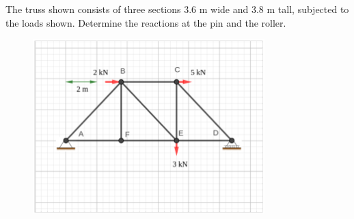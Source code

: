 
The truss shown consists of three sections 3.6 m wide and 3.8 m tall, subjected to the loads shown.
Determine the reactions at the pin and the roller.

\begin{figure}[ht!]
  \centering
  \includegraphics[width=0.8\textwidth,height=0.5\textheight,keepaspectratio]{fig.png}
\end{figure}

\iftoggle{flagSoln}{%
\vspace{.5cm}
\rule{\textwidth}{.4pt}
\vspace{.5cm}
\textbf{Solution:}
$D = 4.463 kN$ up, $A_x = 7 kN$, $A_y = 1.463 kN$ (TODO: check signs)
}{%
}%
